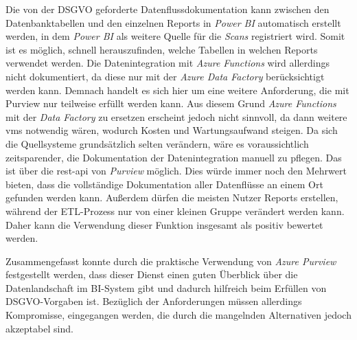 Die von der DSGVO geforderte Datenflussdokumentation kann zwischen den Datenbanktabellen und den einzelnen Reports in \textit{Power BI} automatisch erstellt werden, in dem \textit{Power BI} als weitere Quelle für die \textit{Scans} registriert wird. Somit ist es möglich, schnell herauszufinden, welche Tabellen in welchen Reports verwendet werden. Die Datenintegration mit \textit{Azure Functions} wird allerdings nicht dokumentiert, da diese nur mit der \textit{Azure Data Factory} berücksichtigt werden kann. Demnach handelt es sich hier um eine weitere Anforderung, die mit Purview nur teilweise erfüllt werden kann. Aus diesem Grund \textit{Azure Functions} mit der \textit{Data Factory} zu ersetzen erscheint jedoch nicht sinnvoll, da dann weitere \acp{vm} notwendig wären, wodurch Kosten und Wartungsaufwand steigen. Da sich die Quellsysteme grundsätzlich selten verändern, wäre es voraussichtlich zeitsparender, die Dokumentation der Datenintegration manuell zu pflegen. Das ist über die \ac{rest}-\ac{api} von \textit{Purview} möglich. Dies würde immer noch den Mehrwert bieten, dass die vollständige Dokumentation aller Datenflüsse an einem Ort gefunden werden kann. Außerdem dürfen die meisten Nutzer Reports erstellen, während der ETL-Prozess nur von einer kleinen Gruppe verändert werden kann. Daher kann die Verwendung dieser Funktion insgesamt als positiv bewertet werden. 

\cite[vgl.][]{lesteve_definitive_2021, msdoc_22_purview_sensLabel, riscutia_data_2021, borosch_cloud_2021}

Zusammengefasst konnte durch die praktische Verwendung von \textit{Azure Purview} festgestellt werden, dass dieser Dienst einen guten Überblick über die Datenlandschaft im BI-System gibt und dadurch hilfreich beim Erfüllen von DSGVO-Vorgaben ist. Bezüglich der Anforderungen müssen allerdings Kompromisse, eingegangen werden, die durch die mangelnden Alternativen jedoch akzeptabel sind.